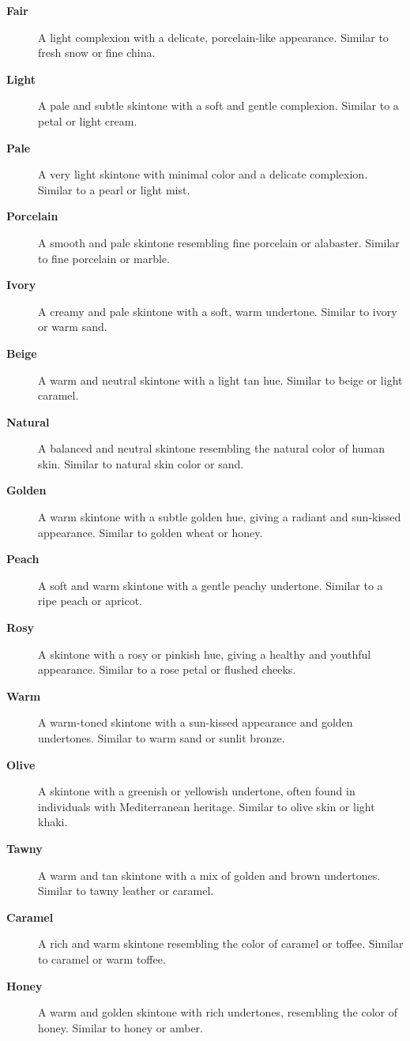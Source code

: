 \documentclass[12pt]{book}
\begin{document}
\begin{description}
    \item[\textbf{Fair}] A light complexion with a delicate, porcelain-like appearance. Similar to fresh snow or fine china.
    \item[\textbf{Light}] A pale and subtle skintone with a soft and gentle complexion. Similar to a petal or light cream.
    \item[\textbf{Pale}] A very light skintone with minimal color and a delicate complexion. Similar to a pearl or light mist.
    \item[\textbf{Porcelain}] A smooth and pale skintone resembling fine porcelain or alabaster. Similar to fine porcelain or marble.
    \item[\textbf{Ivory}] A creamy and pale skintone with a soft, warm undertone. Similar to ivory or warm sand.
    \item[\textbf{Beige}] A warm and neutral skintone with a light tan hue. Similar to beige or light caramel.
    \item[\textbf{Natural}] A balanced and neutral skintone resembling the natural color of human skin. Similar to natural skin color or sand.
    \item[\textbf{Golden}] A warm skintone with a subtle golden hue, giving a radiant and sun-kissed appearance. Similar to golden wheat or honey.
    \item[\textbf{Peach}] A soft and warm skintone with a gentle peachy undertone. Similar to a ripe peach or apricot.
    \item[\textbf{Rosy}] A skintone with a rosy or pinkish hue, giving a healthy and youthful appearance. Similar to a rose petal or flushed cheeks.
    \item[\textbf{Warm}] A warm-toned skintone with a sun-kissed appearance and golden undertones. Similar to warm sand or sunlit bronze.
    \item[\textbf{Olive}] A skintone with a greenish or yellowish undertone, often found in individuals with Mediterranean heritage. Similar to olive skin or light khaki.
    \item[\textbf{Tawny}] A warm and tan skintone with a mix of golden and brown undertones. Similar to tawny leather or caramel.
    \item[\textbf{Caramel}] A rich and warm skintone resembling the color of caramel or toffee. Similar to caramel or warm toffee.
    \item[\textbf{Honey}] A warm and golden skintone with rich undertones, resembling the color of honey. Similar to honey or amber.

\end{description}
\end{document}
